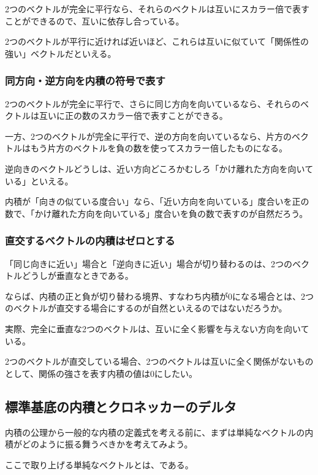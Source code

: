 \documentclass[../../imaging-math]{subfiles}
\begin{document}
2つのベクトルが完全に平行なら、それらのベクトルは互いにスカラー倍で表すことができるので、互いに依存し合っている。

2つのベクトルが平行に近ければ近いほど、これらは互いに似ていて「関係性の強い」ベクトルだといえる。

\subsubsection{同方向・逆方向を内積の符号で表す}

2つのベクトルが完全に平行で、さらに同じ方向を向いているなら、それらのベクトルは互いに正の数のスカラー倍で表すことができる。

一方、2つのベクトルが完全に平行で、逆の方向を向いているなら、片方のベクトルはもう片方のベクトルを負の数を使ってスカラー倍したものになる。

逆向きのベクトルどうしは、近い方向どころかむしろ「かけ離れた方向を向いている」といえる。

\br

内積が「向きの似ている度合い」なら、「近い方向を向いている」度合いを正の数で、「かけ離れた方向を向いている」度合いを負の数で表すのが自然だろう。

\subsubsection{直交するベクトルの内積はゼロとする}

「同じ向きに近い」場合と「逆向きに近い」場合が切り替わるのは、2つのベクトルどうしが垂直なときである。

ならば、内積の正と負が切り替わる境界、すなわち内積が$0$になる場合とは、2つのベクトルが直交する場合にするのが自然といえるのではないだろうか。

\br

実際、完全に垂直な2つのベクトルは、互いに全く影響を与えない方向を向いている。

2つのベクトルが直交している場合、2つのベクトルは互いに全く関係がないものとして、関係の強さを表す内積の値は$0$にしたい。

\subsection{標準基底の内積とクロネッカーのデルタ}

内積の公理から一般的な内積の定義式を考える前に、まずは単純なベクトルの内積がどのように振る舞うべきかを考えてみよう。

ここで取り上げる単純なベクトルとは、である。
\end{document}
